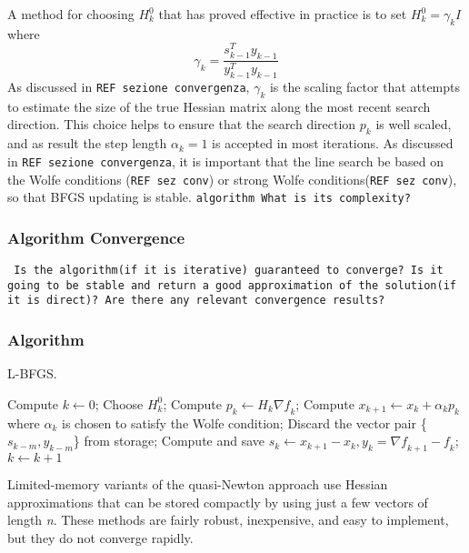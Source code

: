 A method for choosing $H^0_{k}$ that has proved effective in practice is to set $H^0_{k}=\gamma_{k}I$  where 
\begin{equation}
\gamma_{k}= \frac{s^T_{k-1}y_{k-1}}{y^T_{k-1}y_{k-1}}
\end{equation}
As discussed in \texttt{REF sezione convergenza}, $\gamma_{k}$ is the scaling factor that attempts to estimate the size of the true Hessian matrix along the most recent search direction. This choice helps to ensure that the search direction $p_{k}$ is well scaled, and as result the step length $\alpha_{k}=1$ is accepted in most iterations. As discussed in \texttt{REF sezione convergenza}, it is important that the line search be based on the Wolfe conditions (\texttt{REF sez conv}) or strong Wolfe conditions(\texttt{REF sez conv}), so that BFGS updating is stable. 
\texttt{algorithm What is its complexity?}

\subsubsection{Algorithm Convergence}
\texttt{ Is the algorithm(if it is iterative) guaranteed to converge? Is it going to be stable and return a good approximation of the solution(if it is direct)?  Are there any relevant convergence results?}

\subsubsection{Algorithm}
\begin{algorithm}[H]
	\caption{L-BFGS.}
	\label{alg:sgd}
	\begin{algorithmic}[4]
		\State Compute $k \gets 0$;
		\Repeat
		\State Choose \textbf{$H^0_k$};
		\State Compute $p_k \gets H_k\nabla \textit{f}_k$;
		\State Compute $x_{k+1} \gets x_{k}+ \alpha_{k}p_{k}$ where $\alpha_{k}$ is chosen to satisfy the Wolfe condition;
		\State Discard the vector pair \{$s_{k-m},y_{k-m}$\} from storage;
		\EndIf
		\State Compute and save $s_k \gets x_{k+1}-x_{k}, y_k=\nabla \textit{f}_{k+1}-\textit{f}_k$;
		\State $k \gets k+1$
		\EndProcedure 
	\end{algorithmic}
\end{algorithm}


Limited-memory variants  of  the  quasi-Newton  approach use  Hessian  approximations  that  can  be stored compactly by using just a few vectors of length \textit{n}. These methods are fairly robust, inexpensive, and easy to implement, but they do not converge rapidly.

